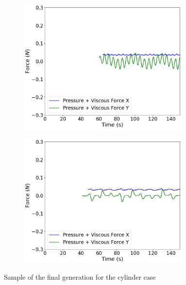 \begin{figure}[h!]
    \centering
    \begin{subfigure}[t]{0.31\textwidth}
        \includegraphics[width=0.95\textwidth, height=0.18\textheight]{Figures/4/OSCg6i6.png}
    \end{subfigure}
    \begin{subfigure}[t]{0.31\textwidth}
        \includegraphics[width=0.95\textwidth, height=0.18\textheight]{Figures/4/OSCg6i3.png}
    \end{subfigure}
    \caption{Sample of the final generation for the cylinder case}
    \label{fig:finalCyl}
\end{figure}


